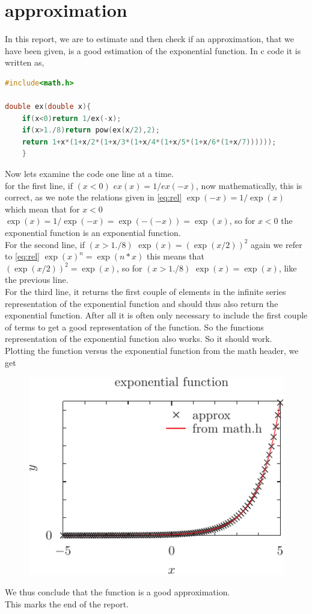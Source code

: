 \documentclass{article}
\begin{document}
\section{approximation}
In this report, we are to estimate and then check if an approximation, that we have been given, is a good estimation of the exponential function. In c code it is written as, 
\begin{lstlisting}[language=C]
#include<math.h>

double ex(double x){
	if(x<0)return 1/ex(-x);
	if(x>1./8)return pow(ex(x/2),2);
	return 1+x*(1+x/2*(1+x/3*(1+x/4*(1+x/5*(1+x/6*(1+x/7))))));
	}
\end{lstlisting}
Now lets examine the code one line at a time.\\
for the first line, if $(x<0)$ $ex(x)=1/ex(-x)$, now mathematically, this is correct, as we note the relations given in \ref{eq:rel} $\exp(-x)=1/\exp(x)$ which mean that for $x<0$ $\exp(x)=1/\exp(-x)= \exp(-(-x))=\exp(x)$, so for $x<0$ the exponential function is an exponential function. \\
For the second line,  if $(x>1./8)$ $\exp(x) = (\exp(x/2))^2$ again we refer to \ref{eq:rel} $\exp(x)^n=\exp(n*x)$ this means that $(\exp(x/2))^2=\exp(x)$, so for $(x>1./8)$ $\exp(x)=\exp(x)$, like the previous line.\\
For the third line, it returns the first couple of elements in the infinite series representation of the exponential function and should thus also return the exponential function. After all it is often only necessary to include the first couple of terms to get a good representation of the function. So the functions representation of the exponential function also works. So it should work.\\
Plotting the function versus the exponential function from the math header, we get
\begin{figure}[h]
	\includegraphics[width=1\textwidth]{pyxplot.pdf}
\end{figure}
We thus conclude that the function is a good approximation. \\
This marks the end of the report.
\end{document}
